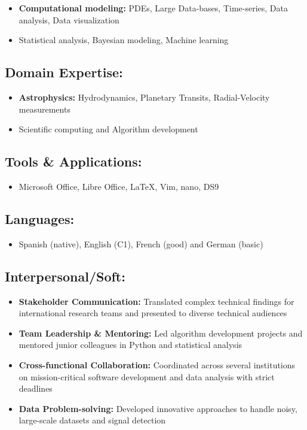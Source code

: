 \documentclass[11pt,a4paper]{article}
\begin{document}
\begin{multicols}{2}
		\begin{itemize}
			\item \textbf{Computational modeling:} PDEs, Large Data-bases, Time-series, Data analysis, Data visualization
			\item Statistical analysis, Bayesian modeling, Machine learning
		\end{itemize}
		
		\subsection{Domain Expertise:}
		
		\begin{itemize}
			\item \textbf{Astrophysics:} Hydrodynamics, Planetary Transits, Radial-Velocity measurements 
			\item Scientific computing and Algorithm development
		\end{itemize}
		
		\subsection{Tools \& Applications:}
		\begin{itemize}
			\item Microsoft Office, Libre Office, \LaTeX, Vim, nano, DS9
		\end{itemize}
		
		\subsection{Languages:}
		\begin{itemize}
		\item Spanish (native), English (C1), French (good) and German (basic)
		\end{itemize}
		
		\subsection{Interpersonal/Soft:}
		
		\begin{itemize}
			\item \textbf{Stakeholder Communication:} Translated complex technical findings for international research teams and presented to diverse technical audiences
			\item \textbf{Team Leadership \& Mentoring:} Led algorithm development projects and mentored junior colleagues in Python and statistical analysis
			\item \textbf{Cross-functional Collaboration:} Coordinated across several institutions on mission-critical software development and data analysis with strict deadlines
			\item \textbf{Data Problem-solving:} Developed innovative approaches to handle noisy, large-scale datasets and signal detection
			

\end{itemize}
\end{multicols}
\end{document}

